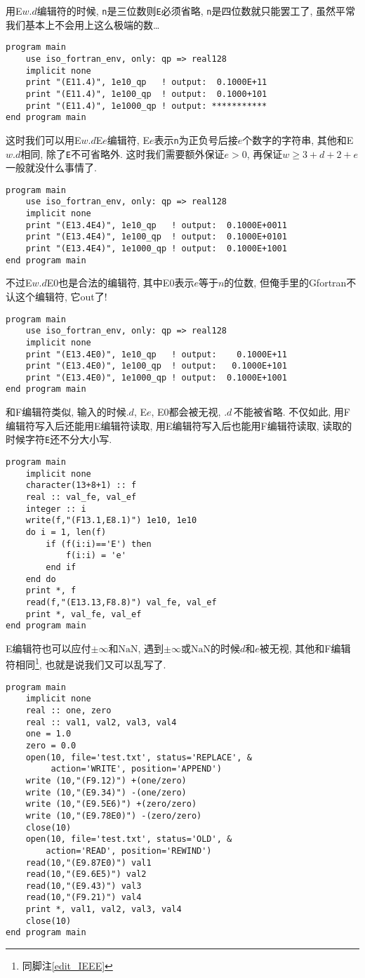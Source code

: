 用E$w.d$编辑符的时候, \verb|n|是三位数则\verb|E|必须省略, \verb|n|是四位数就只能罢工了, 虽然平常我们基本上不会用上这么极端的数\dots
\begin{verbatim}
program main
    use iso_fortran_env, only: qp => real128
    implicit none
    print "(E11.4)", 1e10_qp   ! output:  0.1000E+11
    print "(E11.4)", 1e100_qp  ! output:  0.1000+101
    print "(E11.4)", 1e1000_qp ! output: ***********
end program main
\end{verbatim}
这时我们可以用E$w.d$E$e$编辑符, E$e$表示\verb|n|为正负号后接$e$个数字的字符串, 其他和E$w.d$相同, 除了\verb|E|不可省略外. 这时我们需要额外保证$e>0$, 再保证$w\geqslant 3+d+2+e$一般就没什么事情了.
\begin{verbatim}
program main
    use iso_fortran_env, only: qp => real128
    implicit none
    print "(E13.4E4)", 1e10_qp   ! output:  0.1000E+0011
    print "(E13.4E4)", 1e100_qp  ! output:  0.1000E+0101
    print "(E13.4E4)", 1e1000_qp ! output:  0.1000E+1001
end program main
\end{verbatim}
不过E$w.d$E0也是合法的编辑符, 其中E0表示$e$等于$n$的位数, 但俺手里的Gfortran不认这个编辑符, 它out了!
\begin{verbatim}
program main
    use iso_fortran_env, only: qp => real128
    implicit none
    print "(E13.4E0)", 1e10_qp   ! output:    0.1000E+11
    print "(E13.4E0)", 1e100_qp  ! output:   0.1000E+101
    print "(E13.4E0)", 1e1000_qp ! output:  0.1000E+1001
end program main
\end{verbatim}

和F编辑符类似, 输入的时候$.d$, E$e$, E0都会被无视, $.d\,$不能被省略. 不仅如此, 用F编辑符写入后还能用E编辑符读取, 用E编辑符写入后也能用F编辑符读取, 读取的时候字符\verb|E|还不分大小写.
\begin{verbatim}
program main
    implicit none
    character(13+8+1) :: f
    real :: val_fe, val_ef
    integer :: i
    write(f,"(F13.1,E8.1)") 1e10, 1e10
    do i = 1, len(f)
        if (f(i:i)=='E') then
            f(i:i) = 'e'
        end if
    end do
    print *, f
    read(f,"(E13.13,F8.8)") val_fe, val_ef
    print *, val_fe, val_ef
end program main
\end{verbatim}

E编辑符也可以应付$\pm\infty$和$\text{NaN}$, 遇到$\pm\infty$或$\text{NaN}$的时候$d$和$e$被无视, 其他和F编辑符相同\footnote{同脚注\ref{edit_IEEE}}, 也就是说我们又可以乱写了.
\begin{verbatim}
program main
    implicit none
    real :: one, zero
    real :: val1, val2, val3, val4
    one = 1.0
    zero = 0.0
    open(10, file='test.txt', status='REPLACE', &
         action='WRITE', position='APPEND')
    write (10,"(F9.12)") +(one/zero)
    write (10,"(E9.34)") -(one/zero)
    write (10,"(E9.5E6)") +(zero/zero)
    write (10,"(E9.78E0)") -(zero/zero)
    close(10)
    open(10, file='test.txt', status='OLD', &
        action='READ', position='REWIND')
    read(10,"(E9.87E0)") val1
    read(10,"(E9.6E5)") val2
    read(10,"(E9.43)") val3
    read(10,"(F9.21)") val4
    print *, val1, val2, val3, val4
    close(10)
end program main
\end{verbatim}

